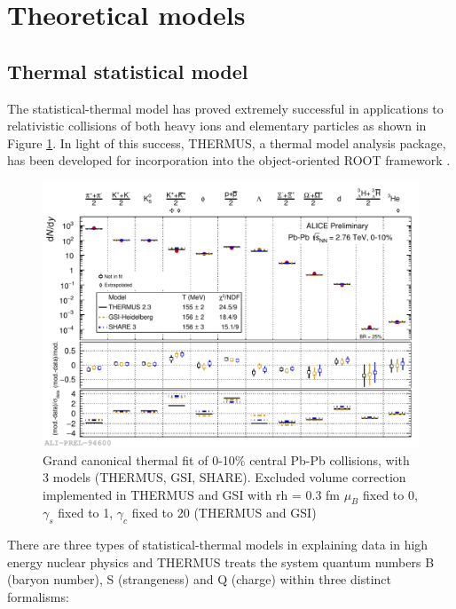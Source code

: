 \section{Theoretical models}\label{sec:model}
\subsection{Thermal statistical model}

The statistical-thermal model has proved extremely successful in applications to relativistic collisions of both heavy ions and elementary particles as shown in Figure \ref{fig:thermal}. In light of this success, THERMUS, a thermal model analysis package, has been developed for incorporation into the object-oriented ROOT framework \cite{Wheaton:2004qb}.\\ 

\begin{figure}[htbp]
\begin{center}
\includegraphics[width=14.cm]{./Version1/FigChapter2/ThermalModel}
\caption{Grand canonical thermal fit of 0-10\% central Pb-Pb collisions, with 3 models (THERMUS, GSI, SHARE). Excluded volume correction implemented in THERMUS and GSI with rh = 0.3 fm $\mu_{B}$ fixed to 0, $\gamma_{s}$ fixed to 1, $\gamma_{c}$ fixed to 20 (THERMUS and GSI)}
\label{fig:thermal}
\end{center}
\end{figure}


There are three types of statistical-thermal models in explaining data in high energy nuclear physics and THERMUS treats the system quantum numbers B (baryon number), S (strangeness) and Q (charge) within three distinct formalisms: 


